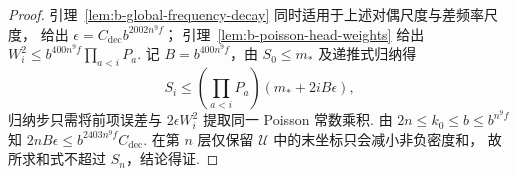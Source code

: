 \begin{proof}
引理~\ref{lem:b-global-frequency-decay} 同时适用于上述对偶尺度与差频率尺度，
给出 $\epsilon=C_{\mathrm{dec}}b^{2002n^9f}$；
引理~\ref{lem:b-poisson-head-weights} 给出
$W_i^2\le b^{400n^9f}\prod_{a<i}P_a$.
记 $B=b^{400n^9 f}$，由 $S_0\le m_*$ 及递推式归纳得
\[
 S_i\le\left(\prod_{a<i}P_a\right)(m_*+2iB\epsilon),
\]
归纳步只需将前项误差与 $2\epsilon W_i^2$ 提取同一 Poisson 常数乘积.
由 $2n\le k_0\le b\le b^{n^9f}$ 知
$2nB\epsilon\le b^{2403n^9f}C_{\mathrm{dec}}$.
在第 $n$ 层仅保留 $\mathcal U$ 中的末坐标只会减小非负密度和，
故所求和式不超过 $S_n$，结论得证.
\end{proof}

